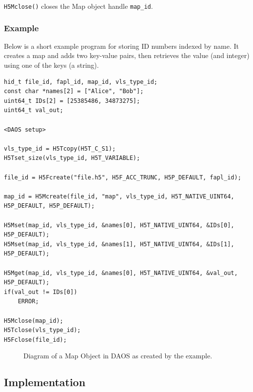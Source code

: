 \verb+H5Mclose()+ closes the Map object handle \verb+map_id+.

\subsubsection{Example}

Below is a short example program for storing ID numbers indexed by name. It creates a map and adds two key-value pairs, then retrieves the value (and integer) using one of the keys (a string).
{
\begin{lstlisting}
hid_t file_id, fapl_id, map_id, vls_type_id;
const char *names[2] = ["Alice", "Bob"];
uint64_t IDs[2] = [25385486, 34873275];
uint64_t val_out;

<DAOS setup>

vls_type_id = H5Tcopy(H5T_C_S1);
H5Tset_size(vls_type_id, H5T_VARIABLE);

file_id = H5Fcreate("file.h5", H5F_ACC_TRUNC, H5P_DEFAULT, fapl_id);

map_id = H5Mcreate(file_id, "map", vls_type_id, H5T_NATIVE_UINT64, H5P_DEFAULT, H5P_DEFAULT);

H5Mset(map_id, vls_type_id, &names[0], H5T_NATIVE_UINT64, &IDs[0], H5P_DEFAULT);
H5Mset(map_id, vls_type_id, &names[1], H5T_NATIVE_UINT64, &IDs[1], H5P_DEFAULT);

H5Mget(map_id, vls_type_id, &names[0], H5T_NATIVE_UINT64, &val_out, H5P_DEFAULT);
if(val_out != IDs[0])
	ERROR;

H5Mclose(map_id);
H5Tclose(vls_type_id);
H5Fclose(file_id);
\end{lstlisting}
}

\begin{figure}
\caption{Diagram of a Map Object in DAOS as created by the example.}
\label{fig:map}
\end{figure}

\subsection{Implementation}

